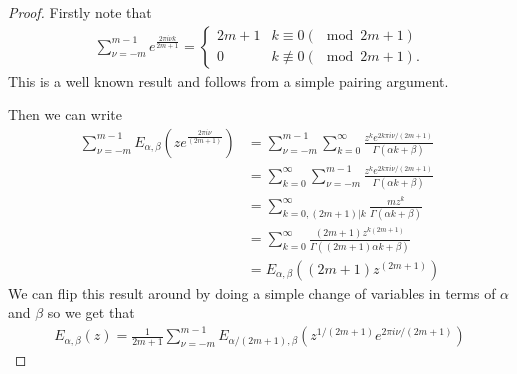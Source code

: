 \begin{proof}
    Firstly note that
    \begin{align*}
        \sum_{\nu=-m}^{m-1} e^{\frac{2\pi i \nu k}{2m+1}} = 
            \begin{cases}
                2m + 1 & k \equiv 0 (\mod 2m+1) \\
                0 & k \not\equiv 0 (\mod 2m+1).
            \end{cases}
    \end{align*}
    This is a well known result and follows from a simple pairing argument.
    
    Then we can write
    \begin{align}
        \sum_{\nu = -m}^{m-1} E_{\alpha,\beta}\left(ze^\frac{2\pi i \nu}{(2m+1)} \right)
            &= \sum_{\nu=-m}^{m-1} \sum_{k=0}^\infty \frac{z^ke^{2k\pi i\nu / (2m+1)}}{\Gamma(\alpha k + \beta)} \\
            &= \sum_{k=0}^\infty \sum_{\nu=-m}^{m-1} \frac{z^ke^{2k\pi i\nu / (2m+1)}}{\Gamma(\alpha k + \beta)} \\
            &= \sum_{k=0, (2m + 1) | k}^\infty \frac{mz^k}{\Gamma(\alpha k + \beta)} \\
            &= \sum_{k=0}^\infty \frac{(2m+1)z^{k(2m+1)}}{\Gamma((2m+1)\alpha k + \beta)} \\
            &= E_{\alpha, \beta}((2m+1)z^{(2m+1)})
    \end{align}
    We can flip this result around by doing a simple change of variables in terms of $ \alpha $ and $ \beta $ so we get that
    \begin{align}
        E_{\alpha, \beta}(z) = \frac{1}{2m+1} \sum_{\nu = -m}^{m-1} E_{\alpha / (2m+1), \beta}\left(z^{1/(2m+1)}e^{2\pi i \nu / (2m+1)}\right)
    \end{align}
\end{proof}

